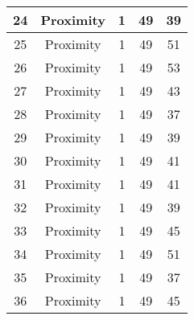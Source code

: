 \documentclass[results.tex]{subfiles}
\begin{document}
\begin{center}
\begin{tabular}{| c || c | c | c | c |}
            \hline
            24                      & Proximity                    & 1                      & 49                      & 39                   \\
            \hline
            25                      & Proximity                    & 1                      & 49                      & 51                   \\
            \hline
            26                      & Proximity                    & 1                      & 49                      & 53                   \\
            \hline
            27                      & Proximity                    & 1                      & 49                      & 43                   \\
            \hline
            28                      & Proximity                    & 1                      & 49                      & 37                   \\
            \hline
            29                      & Proximity                    & 1                      & 49                      & 39                   \\
            \hline
            30                      & Proximity                    & 1                      & 49                      & 41                   \\
            \hline
            31                      & Proximity                    & 1                      & 49                      & 41                   \\
            \hline
            32                      & Proximity                    & 1                      & 49                      & 39                   \\
            \hline
            33                      & Proximity                    & 1                      & 49                      & 45                   \\
            \hline
            34                      & Proximity                    & 1                      & 49                      & 51                   \\
            \hline
            35                      & Proximity                    & 1                      & 49                      & 37                   \\
            \hline
            36                      & Proximity                    & 1                      & 49                      & 45                   \\

\end{tabular}
\end{center}
\end{document}
